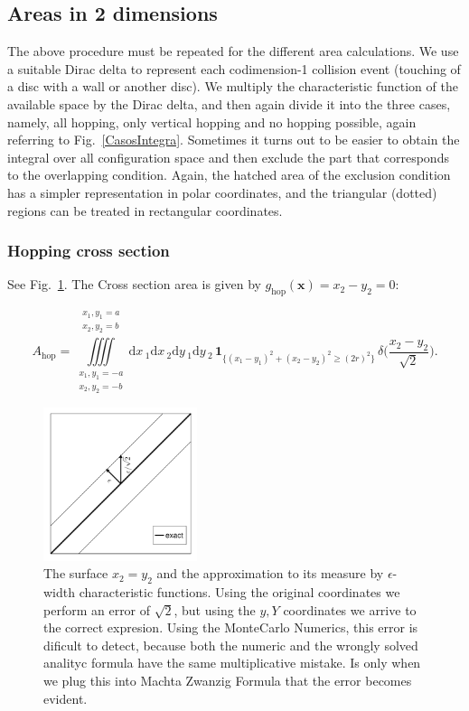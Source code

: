 \documentclass[superscriptaddress,pre,reprint,showpacs,twocolumn]{revtex4-1}
\newcommand{\rd}[1]{\mathrm{d}{#1} \,}
\newcommand{\indicatorsymbol}{\mathbf{1}}
\newcommand{\indicator}[1]{\indicatorsymbol_{ \{   #1 \} } }
\begin{document}
\subsection{Areas in 2 dimensions}

The above procedure must be repeated for the different
area calculations. We use a suitable Dirac delta to represent each codimension-1 collision
event (touching of a disc with a wall or another disc). We multiply the characteristic function of the available space by the Dirac delta, and
then again divide it into the three cases, namely, all hopping, only vertical hopping
and no hopping possible, again referring to Fig.~\ref{CasosIntegra}.
Sometimes it turns out to be easier to obtain 
the integral  over all configuration space and then exclude the part that
corresponds to the overlapping condition. Again, the hatched area of the exclusion
condition has a simpler representation in polar coordinates, and the triangular
(dotted) regions can be treated in rectangular coordinates.


\subsubsection{Hopping cross section}

See Fig.~\ref{DiagramaDelta01}. 
The Cross section area is given by
$g_\text{hop}(\mathbf{x}) = x_2 - y_2 = 0$:

\begin{widetext}\label{ahopcart}
\begin{equation}
  A_\text{hop} =
\iiiint
\limits_{\substack{x_1, y_1 = -a \\ x_2, y_2 = -b}}^{\substack{x_1, y_1 = a \\ x_2, y_2 = b}}
\rd x_1 \rd x_2 \rd y_1 \rd y_2 
 \, \indicator{ (x_1-y_1)^2 + (x_2-y_2)^2 \ge (2r)^2 } \, \delta \big(\frac{x_2-y_2}{\sqrt{2}}\big).
\end{equation}
\end{widetext}



\begin{figure}
\includegraphics[width=0.4\textwidth]{figures/diagramdelta01.pdf}
\caption{The surface $x_2=y_2$ and the approximation to its measure by
  $\epsilon$-width characteristic functions. Using the original coordinates
  we perform an error of $\sqrt{2}$, but using the $y,Y$ coordinates
  we arrive to the correct expresion. Using the MonteCarlo Numerics, this
  error is dificult to detect, because both the numeric and the wrongly solved
  analityc formula have the same multiplicative mistake. Is only when we plug this into
Machta Zwanzig Formula that the error becomes evident. }\label{DiagramaDelta01}
\end{figure}
\end{document}

